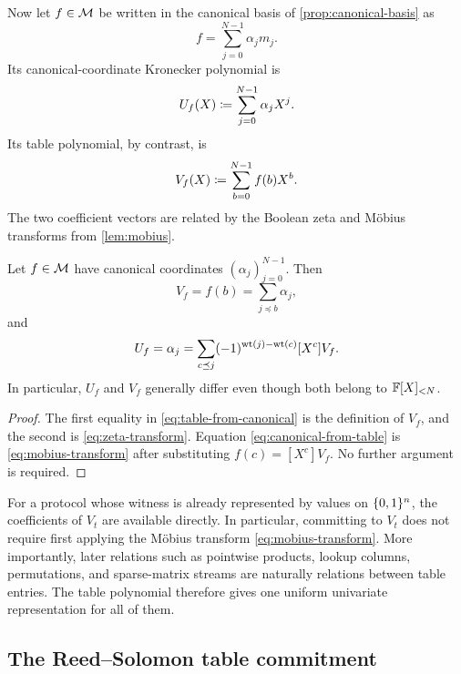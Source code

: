 Now let $f\in\mathcal{M}$ be written in the canonical basis of \cref{prop:canonical-basis} as
\[
  f=\sum_{j=0}^{N-1}\alpha_jm_j.
\]
Its canonical-coordinate Kronecker polynomial is
\begin{equation}
  U_f(X)
  \coloneqq
  \sum_{j=0}^{N-1}\alpha_jX^j.
  \label{eq:canonical-kronecker-polynomial}
\end{equation}
Its table polynomial, by contrast, is
\[
  V_f(X)
  \coloneqq
  \sum_{b=0}^{N-1}f(b)X^b.
\]
The two coefficient vectors are related by the Boolean zeta and M\"obius transforms from \cref{lem:mobius}.

\begin{proposition}
\label{prop:canonical-table-kronecker}
Let $f\in\mathcal{M}$ have canonical coordinates $(\alpha_j)_{j=0}^{N-1}$.  Then
\begin{equation}
  [X^b]V_f
  =f(b)
  =\sum_{j\preceq b}\alpha_j,
  \label{eq:table-from-canonical}
\end{equation}
and
\begin{equation}
  [X^j]U_f
  =\alpha_j
  =\sum_{c\preceq j}(-1)^{\wt(j)-\wt(c)}[X^c]V_f.
  \label{eq:canonical-from-table}
\end{equation}
In particular, $U_f$ and $V_f$ generally differ even though both belong to $\mathbb{F}[X]_{<N}$.
\end{proposition}

\begin{proof}
The first equality in \eqref{eq:table-from-canonical} is the definition of $V_f$, and the second is \eqref{eq:zeta-transform}.  Equation \eqref{eq:canonical-from-table} is \eqref{eq:mobius-transform} after substituting $f(c)=[X^c]V_f$.  No further argument is required.
\end{proof}

\begin{remark}
\label{rem:why-table-form}
For a protocol whose witness is already represented by values on $\{0,1\}^n$, the coefficients of $V_t$ are available directly.  In particular, committing to $V_t$ does not require first applying the M\"obius transform \eqref{eq:mobius-transform}.  More importantly, later relations such as pointwise products, lookup columns, permutations, and sparse-matrix streams are naturally relations between table entries.  The table polynomial therefore gives one uniform univariate representation for all of them.
\end{remark}

\subsection{The Reed--Solomon table commitment}
\label{sec:table-commitment}

